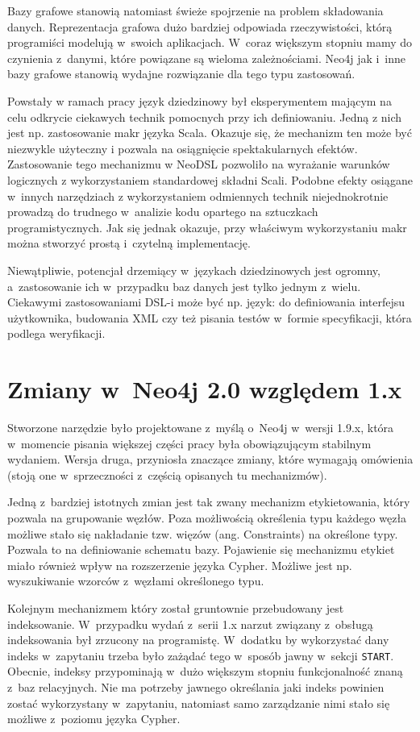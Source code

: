 \documentclass{xmgr}
\begin{document}
Bazy grafowe stanowią natomiast świeże spojrzenie na problem składowania danych. Reprezentacja grafowa dużo bardziej odpowiada rzeczywistości, którą programiści modelują w~swoich aplikacjach. W~coraz większym stopniu mamy do czynienia z~danymi, które powiązane są wieloma zależnościami. Neo4j jak i~inne bazy grafowe stanowią wydajne rozwiązanie dla tego typu zastosowań.

Powstały w ramach pracy język dziedzinowy był eksperymentem mającym na celu odkrycie ciekawych technik pomocnych przy ich definiowaniu. Jedną z nich jest np. zastosowanie makr języka Scala. Okazuje się, że mechanizm ten może być niezwykle użyteczny i pozwala na osiągnięcie spektakularnych efektów. Zastosowanie tego mechanizmu w NeoDSL pozwoliło na wyrażanie warunków logicznych z wykorzystaniem standardowej składni Scali. Podobne efekty osiągane w~innych narzędziach z wykorzystaniem odmiennych technik niejednokrotnie prowadzą do trudnego w~analizie kodu opartego na sztuczkach programistycznych. Jak się jednak okazuje, przy właściwym wykorzystaniu makr można stworzyć prostą i~czytelną implementację.

Niewątpliwie, potencjał drzemiący w~językach dziedzinowych jest ogromny, a~zastosowanie ich w~przypadku baz danych jest tylko jednym z~wielu. Ciekawymi zastosowaniami DSL-i może być np. język: do definiowania interfejsu użytkownika, budowania XML czy też pisania testów w~formie specyfikacji, która podlega weryfikacji.

\appendix
\chapter{Zmiany w~Neo4j 2.0 względem 1.x}

Stworzone narzędzie było projektowane z~myślą o~Neo4j w~wersji 1.9.x, która w~momencie pisania większej części pracy była obowiązującym stabilnym wydaniem. Wersja druga, przyniosła znaczące zmiany, które wymagają omówienia (stoją one w~sprzeczności z~częścią opisanych tu mechanizmów).

Jedną z~bardziej istotnych zmian jest tak zwany mechanizm etykietowania, który pozwala na grupowanie węzłów. Poza możliwością określenia typu każdego węzła możliwe stało się nakładanie tzw. więzów (ang. Constraints) na określone typy. Pozwala to na definiowanie schematu bazy. Pojawienie się mechanizmu etykiet miało również wpływ na rozszerzenie języka Cypher. Możliwe jest np. wyszukiwanie wzorców z~węzłami określonego typu.

Kolejnym mechanizmem który został gruntownie przebudowany jest indeksowanie. W~przypadku wydań z~serii 1.x narzut związany z~obsługą indeksowania był zrzucony na programistę. W~dodatku by wykorzystać dany indeks w~zapytaniu trzeba było zażądać tego w~sposób jawny w~sekcji \texttt{START}. Obecnie, indeksy przypominają w~dużo większym stopniu funkcjonalność znaną z~baz relacyjnych. Nie ma potrzeby jawnego określania jaki indeks powinien zostać wykorzystany w~zapytaniu, natomiast samo zarządzanie nimi stało się możliwe z~poziomu języka Cypher.
\end{document}
